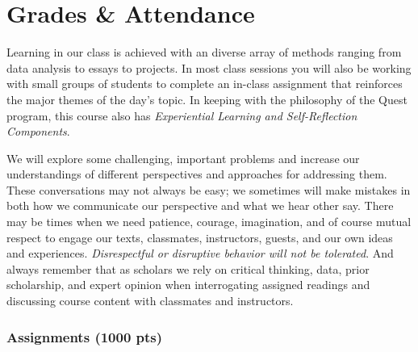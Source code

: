 \documentclass[
  10pt,
  letterpaper,
  oneside,
  open=any]{scrbook}
\begin{document}

\chapter{Grades \& Attendance}\label{grades-attendance}

Learning in our class is achieved with an diverse array of methods
ranging from data analysis to essays to projects. In most class sessions
you will also be working with small groups of students to complete an
in-class assignment that reinforces the major themes of the day's topic.
In keeping with the philosophy of the Quest program, this course also
has \emph{Experiential Learning and Self-Reflection Components}.

\begin{tcolorbox}[enhanced jigsaw, title=\textcolor{quarto-callout-tip-color}{\faLightbulb}\hspace{0.5em}{Important note regarding class discussions \& group work.}, left=2mm, coltitle=black, colback=white, opacitybacktitle=0.6, arc=.35mm, leftrule=.75mm, toprule=.15mm, toptitle=1mm, bottomtitle=1mm, colbacktitle=quarto-callout-tip-color!10!white, breakable, titlerule=0mm, bottomrule=.15mm, opacityback=0, rightrule=.15mm, colframe=quarto-callout-tip-color-frame]

We will explore some challenging, important problems and increase our
understandings of different perspectives and approaches for addressing
them. These conversations may not always be easy; we sometimes will make
mistakes in both how we communicate our perspective and what we hear
other say. There may be times when we need patience, courage,
imagination, and of course mutual respect to engage our texts,
classmates, instructors, guests, and our own ideas and experiences.
\emph{Disrespectful or disruptive behavior will not be tolerated}. And
always remember that as scholars we rely on critical thinking, data,
prior scholarship, and expert opinion when interrogating assigned
readings and discussing course content with classmates and instructors.

\end{tcolorbox}

\subsection*{Assignments (1000 pts)}\label{assignments-1000-pts}
\end{document}
